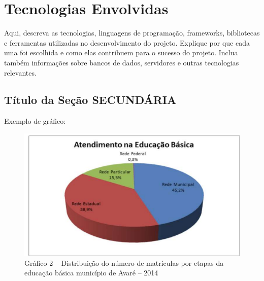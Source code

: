 \chapter{Tecnologias Envolvidas} \label{cha:tecnologias}

Aqui, descreva as tecnologias, linguagens de programação, frameworks, bibliotecas e ferramentas utilizadas no desenvolvimento do projeto. Explique por que cada uma foi escolhida e como elas contribuem para o sucesso do projeto. Inclua também informações sobre bancos de dados, servidores e outras tecnologias relevantes.

\section{Título da Seção SECUNDÁRIA}



Exemplo de gráfico:



\begin{figure}[H]
\renewcommand{\figurename}{Gráfico}	
\caption*{ \label{graf2}Gráfico 2 – Distribuição do número de matrículas por etapas da 
educação básica município de Avaré – 2014}
	\begin{center}
	    \includegraphics[scale=1.0]{imagens/grafs_1.png}
	\end{center}

\end{figure}

\renewcommand{\figurename}{Figura}	

\setcounter{secnumdepth}{4}

